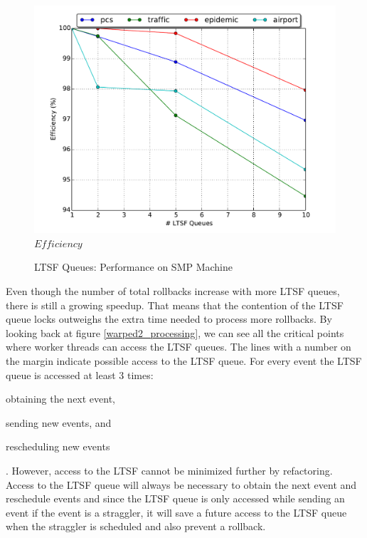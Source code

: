 \documentclass[11pt]{book}
\begin{document}
\begin{figure}
\begin{minipage}{.5\textwidth}
\begin{center}
      \includegraphics[width=\textwidth,keepaspectratio,quiet]{figs/pending_event_set/ltsf_efficiency.pdf} \\
      $Efficiency$ \\
    \end{center}
  \end{minipage}
  \caption{LTSF Queues: Performance on SMP Machine}\label{ltsf_analysis}
\end{figure}

Even though the number of total rollbacks increase with more LTSF queues, there is still a
growing speedup. That means that the contention of the LTSF queue locks outweighs the extra time
needed to process more rollbacks. By looking back at figure \ref{warped2_processing}, we can see all
the critical points where worker threads can access the LTSF queues. The lines with a number on
the margin indicate possible access to the LTSF queue. For every event the LTSF queue is accessed
at least 3 times: \begin{inparaenum}[(1)] \item obtaining the next event, \item sending new
events, and \item rescheduling new events \end{inparaenum}. However, access to the LTSF cannot
be minimized further by refactoring. Access to the LTSF queue will always be necessary to obtain
the next event and reschedule events and since the LTSF queue is only accessed while sending an
event if the event is a straggler, it will save a future access to the LTSF queue when the straggler
is scheduled and also prevent a rollback.
\end{document}
